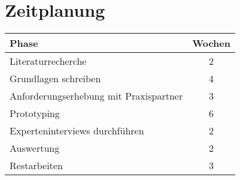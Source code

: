 \section{Zeitplanung}
\begin{center}
	\begin{tabular}{|l|c|}
		\hline
		\rowcolor{gray!50} \textbf{Phase} & \textbf{Wochen} \\
		\hline
		Literaturrecherche & 2 \\
		\hline
		Grundlagen schreiben & 4 \\
		\hline
		Anforderungserhebung mit Praxispartner& 3 \\
		\hline
		Prototyping & 6 \\
		\hline
		Experteninterviews durchführen & 2 \\
		\hline
		Auswertung & 2 \\
		\hline
		Restarbeiten & 3 \\
		\hline
	\end{tabular}
\end{center}
\newpage
